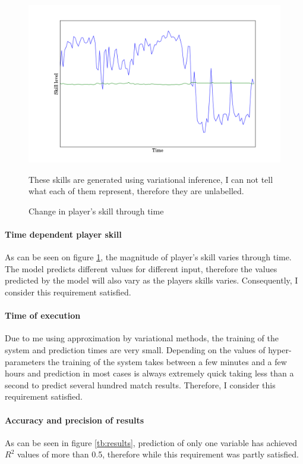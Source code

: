 \documentclass[12pt,a4paper]{book}
\newcommand\note[1]{\vspace*{-0.5\baselineskip}\caption*{#1}}
\begin{document}
\begin{figure}[ht]
\centering
\includegraphics[scale=0.5]{player_skill}
\caption{Change in player's skill through time}
\note{These skills are generated using variational inference, I can not tell what each of them represent, therefore they are unlabelled.}
\label{fig:player-skill}
\end{figure}

\paragraph{Time dependent player skill}
As can be seen on figure \ref{fig:player-skill}, the magnitude of player's skill varies through time.
The model predicts different values for different input, therefore the values predicted by the model will also vary as the players skills varies.
Consequently, I consider this requirement satisfied.

\paragraph{Time of execution}
Due to me using approximation by variational methods, the training of the system and prediction times are very small.
Depending on the values of hyper-parameters the training of the system takes between a few minutes and a few hours and prediction in most cases is always extremely quick taking less than a second to predict several hundred match results.
Therefore, I consider this requirement satisfied.

\paragraph{Accuracy and precision of results}
As can be seen in figure \ref{tb:results}, prediction of only one variable has achieved $R^2$ values of more than 0.5, therefore while this requirement was partly satisfied.
\end{document}
